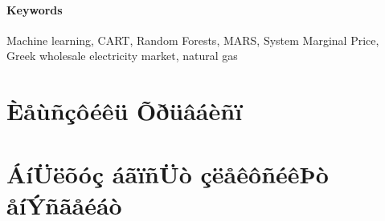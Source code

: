 \documentclass[12pt, twoside, a4paper]{book}
\newcommand{\gr}{\selectlanguage{greek}}
\begin{document}
\subsection*{Keywords}
Machine learning, CART, Random Forests, MARS, System Marginal Price, Greek wholesale electricity market, natural gas

\gr


\newpage
\thispagestyle{empty}

\tableofcontents
{}
\newpage
\thispagestyle{empty}

\listoffigures
\newpage
\thispagestyle{empty}


\part{Èåùñçôéêü Õðüâáèñï}





\newpage
\thispagestyle{empty}
\part{ÁíÜëõóç áãïñÜò çëåêôñéêÞò åíÝñãåéáò}





\newpage
\thispagestyle{empty}
\makeatletter %
\renewcommand\@biblabel[1]{(#1)} %
\makeatother

\newpage
\thispagestyle{empty}


%
\end{document}
